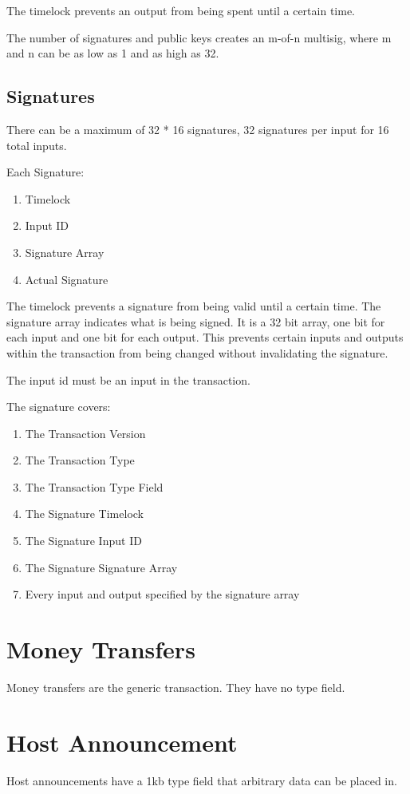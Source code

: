 \documentclass[twocolumn]{article}
\begin{document}
The timelock prevents an output from being spent until a certain time.

The number of signatures and public keys creates an m-of-n multisig, where m and n can be as low as 1 and as high as 32.

\subsection{Signatures}
There can be a maximum of 32 * 16 signatures, 32 signatures per input for 16 total inputs.

Each Signature:
\begin{enumerate}
	\item Timelock
	\item Input ID
	\item Signature Array
	\item Actual Signature
\end{enumerate}

The timelock prevents a signature from being valid until a certain time.
The signature array indicates what is being signed.
It is a 32 bit array, one bit for each input and one bit for each output.
This prevents certain inputs and outputs within the transaction from being changed without invalidating the signature.

The input id must be an input in the transaction.

The signature covers:
\begin{enumerate}
	\item The Transaction Version
	\item The Transaction Type
	\item The Transaction Type Field
	\item The Signature Timelock
	\item The Signature Input ID
	\item The Signature Signature Array
	\item Every input and output specified by the signature array
\end{enumerate}

\section{Money Transfers}
Money transfers are the generic transaction.
They have no type field.

\section{Host Announcement}
Host announcements have a 1kb type field that arbitrary data can be placed in.
\end{document}
